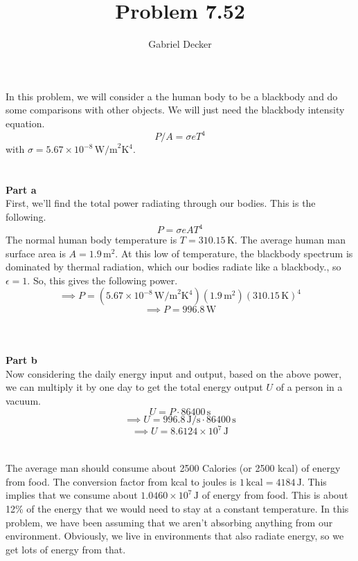 \documentclass[12pt]{article}
\title{Problem 7.52}
\author{Gabriel Decker}
\begin{document}
\maketitle
\begin{flushleft}



In this problem, we will consider a the human body to be a blackbody and do some comparisons with other objects.
We will just need the blackbody intensity equation.
\begin{equation}
    P/A=\sigma eT^4
\end{equation}
with $\sigma=5.67\times10^{-8}\,\text{W/m}^2\text{K}^4$.\\~\\~\\


\textbf{Part a}\\
First, we'll find the total power radiating through our bodies.
This is the following.
$$P=\sigma eAT^4$$
The normal human body temperature is $T=310.15\,\text{K}$.
The average human man surface area is $A=1.9\,\text{m}^2$.
At this low of temperature, the blackbody spectrum is dominated by thermal radiation, which our bodies radiate like a blackbody., so $\epsilon=1$.
So, this gives the following power.
$$\implies P=(5.67\times10^{-8}\,\text{W/m}^2\text{K}^4)(1.9\,\text{m}^2)(310.15\,\text{K})^4$$
$$\implies P=996.8\,\text{W}$$\\~\\~\\



\textbf{Part b}\\
Now considering the daily energy input and output, based on the above power, we can multiply it by one day to get the total energy output $U$ of a person in a vacuum.
$$U=P\cdot86400\,\text{s}$$
$$\implies U=996.8\,\text{J/s}\cdot86400\,\text{s}$$
$$\implies U=8.6124\times10^7\,\text{J}$$\\~\\

The average man should consume about 2500 Calories (or 2500 kcal) of energy from food.
The conversion factor from kcal to joules is $1\,\text{kcal}=4184\,\text{J}$.
This implies that we consume about $1.0460\times10^7\,\text{J}$ of energy from food.
This is about 12\% of the energy that we would need to stay at a constant temperature.
In this problem, we have been assuming that we aren't absorbing anything from our environment.
Obviously, we live in environments that also radiate energy, so we get lots of energy from that.\\~\\~\\




\end{flushleft}
\end{document}
